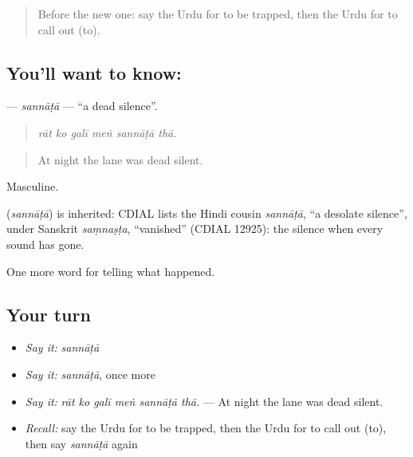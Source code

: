 \label{lesson:UR-C295-sannata}



\begin{quote}
Before the new one: say the Urdu for to be trapped, then the Urdu for to call out (to).
\end{quote}

\subsection*{You'll want to know: }
\textbf{} — \emph{sannāṭā} — \textquotedblleft{}a dead silence\textquotedblright{}.

\begin{quote}
     
\end{quote}

\begin{quote}
\emph{rāt ko galī meṅ sannāṭā thā.}
\end{quote}

\begin{quote}
At night the lane was dead silent.
\end{quote}

Masculine.

\begin{cousinweb}
\textbf{} (\emph{sannāṭā}) is inherited: CDIAL lists the Hindi cousin \emph{sannāṭā}, \textquotedblleft{}a desolate silence\textquotedblright{}, under Sanskrit \emph{saṃnaṣṭa}, \textquotedblleft{}vanished\textquotedblright{} (CDIAL 12925): the silence when every sound has gone.
\end{cousinweb}

\begin{grammarlens}[title={What you've built}]
One more word for telling what happened.
\end{grammarlens}

\subsection*{Your turn}
\begin{itemize}
\raggedright
  \item \emph{Say it:} \emph{sannāṭā}
  \item \emph{Say it:} \emph{sannāṭā}, once more
  \item \emph{Say it:} \emph{rāt ko galī meṅ sannāṭā thā.} — At night the lane was dead silent.
  \item \emph{Recall:} say the Urdu for to be trapped, then the Urdu for to call out (to), then say \emph{sannāṭā} again
\end{itemize}

